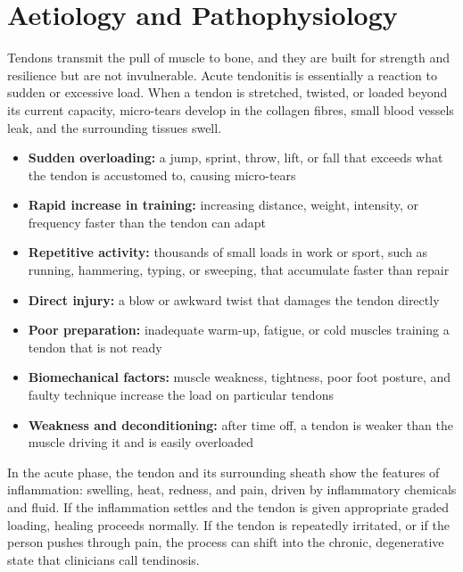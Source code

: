 \section*{Aetiology and Pathophysiology}
Tendons transmit the pull of muscle to bone, and they are built for strength and resilience but are not invulnerable. Acute tendonitis is essentially a reaction to sudden or excessive load. When a tendon is stretched, twisted, or loaded beyond its current capacity, micro-tears develop in the collagen fibres, small blood vessels leak, and the surrounding tissues swell.

\begin{itemize}
    \item \textbf{Sudden overloading:} a jump, sprint, throw, lift, or fall that exceeds what the tendon is accustomed to, causing micro-tears
    \item \textbf{Rapid increase in training:} increasing distance, weight, intensity, or frequency faster than the tendon can adapt
    \item \textbf{Repetitive activity:} thousands of small loads in work or sport, such as running, hammering, typing, or sweeping, that accumulate faster than repair
    \item \textbf{Direct injury:} a blow or awkward twist that damages the tendon directly
    \item \textbf{Poor preparation:} inadequate warm-up, fatigue, or cold muscles training a tendon that is not ready
    \item \textbf{Biomechanical factors:} muscle weakness, tightness, poor foot posture, and faulty technique increase the load on particular tendons
    \item \textbf{Weakness and deconditioning:} after time off, a tendon is weaker than the muscle driving it and is easily overloaded
\end{itemize}

In the acute phase, the tendon and its surrounding sheath show the features of inflammation: swelling, heat, redness, and pain, driven by inflammatory chemicals and fluid. If the inflammation settles and the tendon is given appropriate graded loading, healing proceeds normally. If the tendon is repeatedly irritated, or if the person pushes through pain, the process can shift into the chronic, degenerative state that clinicians call tendinosis.

